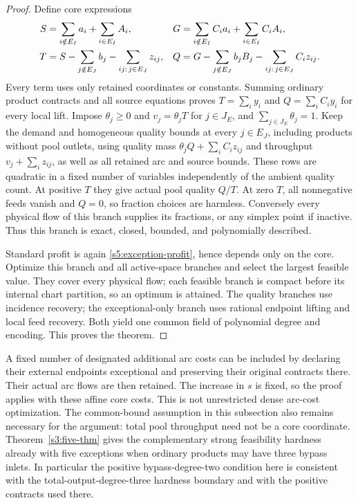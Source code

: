 \begin{proof}
Define core expressions
\begin{align}
 S&=\sum_{i\notin E_I}a_i+\sum_{i\in E_I}A_i,&
 G&=\sum_{i\notin E_I}C_i a_i+\sum_{i\in E_I}C_i A_i,\notag\\
 T&=S-\sum_{j\notin E_J}b_j-
                     \sum_{ij:\,j\in E_J}z_{ij},&
 Q&=G-\sum_{j\notin E_J}b_jB_j-
                     \sum_{ij:\,j\in E_J}C_i z_{ij}.
 \label{s5:exceptional-only-masses}
\end{align}
Every term uses only retained coordinates or constants. Summing
ordinary product contracts and all source equations proves
$T=\sum_i y_i$ and $Q=\sum_iC_i y_i$ for every local lift. Impose
$\theta_j\ge0$ and $v_j=\theta_jT$ for $j\in J_E$, and
$\sum_{j\in J_E}\theta_j=1$. Keep the demand and homogeneous quality
bounds at every $j\in E_J$, including products without pool outlets,
using quality mass
$\theta_jQ+\sum_iC_i z_{ij}$ and throughput $v_j+\sum_i z_{ij}$,
as well as all retained arc and source bounds. These rows are quadratic
in a fixed number of variables independently of the ambient quality
count. At positive $T$ they give actual pool quality $Q/T$. At zero
$T$, all nonnegative feeds vanish and $Q=0$, so fraction choices are
harmless. Conversely every physical flow of this branch supplies its
fractions, or any simplex point if inactive. Thus this branch is exact,
closed, bounded, and polynomially described.

Standard profit is again \eqref{s5:exception-profit}, hence depends
only on the core. Optimize this branch and all active-space branches
and select the largest feasible value. They cover every physical flow;
each feasible branch is compact before its internal chart partition,
so an optimum is attained. The quality branches use incidence recovery;
the exceptional-only branch uses rational endpoint lifting and local
feed recovery. Both yield one common field of polynomial degree and
encoding. This proves the theorem.
\end{proof}

A fixed number of designated additional arc costs can be included by
declaring their external endpoints exceptional and preserving their
original contracts there. Their actual arc flows are then retained.
The increase in $s$ is fixed, so the proof applies with these affine
core costs. This is not unrestricted dense arc-cost optimization.
The common-bound assumption in this subsection also remains necessary
for the argument: total pool throughput need not be a core coordinate.
Theorem~\ref{s3:five-thm} gives the complementary strong feasibility
hardness already with five exceptions when ordinary products may have
three bypass inlets. In particular the positive bypass-degree-two
condition here is consistent with the total-output-degree-three
hardness boundary and with the positive contracts used there.

